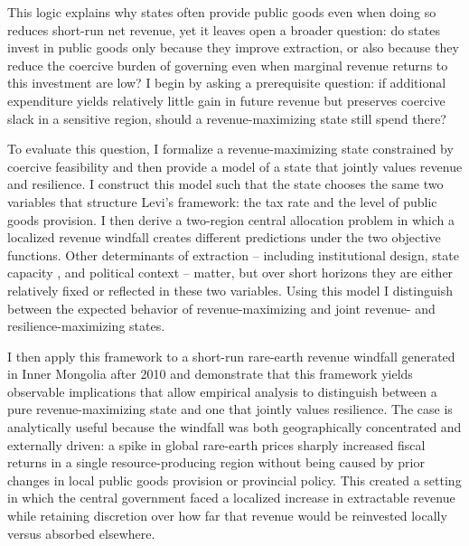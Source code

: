 \documentclass[12pt]{article}
\begin{document}
This logic explains why states often provide public goods even when doing so reduces short-run net revenue, yet it leaves open a broader question: do states invest in public goods only because they improve extraction, or also because they reduce the coercive burden of governing even when marginal revenue returns to this investment are low? I begin by asking a prerequisite question: if additional expenditure yields relatively little gain in future revenue but preserves coercive slack in a sensitive region, should a revenue-maximizing state still spend there?

To evaluate this question, I formalize a revenue-maximizing state constrained by coercive feasibility and then provide a model of a state that jointly values revenue and resilience. I construct this model such that the state chooses the same two variables that structure Levi's framework: the tax rate and the level of public goods provision. I then derive a two-region central allocation problem in which a localized revenue windfall creates different predictions under the two objective functions. Other determinants of extraction -- including institutional design, state capacity \parencite[]{besleyOriginsStateCapacity2009}, and political context -- matter, but over short horizons they are either relatively fixed or reflected in these two variables. Using this model I distinguish between the expected behavior of revenue-maximizing and joint revenue- and resilience-maximizing states.

I then apply this framework to a short-run rare-earth revenue windfall generated in Inner Mongolia after 2010 and demonstrate that this framework yields observable implications that allow empirical analysis to distinguish between a pure revenue-maximizing state and one that jointly values resilience. The case is analytically useful because the windfall was both geographically concentrated and externally driven: a spike in global rare-earth prices sharply increased fiscal returns in a single resource-producing region without being caused by prior changes in local public goods provision or provincial policy. This created a setting in which the central government faced a localized increase in extractable revenue while retaining discretion over how far that revenue would be reinvested locally versus absorbed elsewhere.
\end{document}
